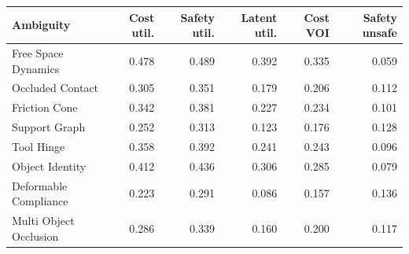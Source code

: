 \begin{tabular}{lrrrrr}
\toprule
Ambiguity & Cost util. & Safety util. & Latent util. & Cost VOI & Safety unsafe \\
\midrule
Free Space Dynamics & 0.478 & 0.489 & 0.392 & 0.335 & 0.059 \\
Occluded Contact & 0.305 & 0.351 & 0.179 & 0.206 & 0.112 \\
Friction Cone & 0.342 & 0.381 & 0.227 & 0.234 & 0.101 \\
Support Graph & 0.252 & 0.313 & 0.123 & 0.176 & 0.128 \\
Tool Hinge & 0.358 & 0.392 & 0.241 & 0.243 & 0.096 \\
Object Identity & 0.412 & 0.436 & 0.306 & 0.285 & 0.079 \\
Deformable Compliance & 0.223 & 0.291 & 0.086 & 0.157 & 0.136 \\
Multi Object Occlusion & 0.286 & 0.339 & 0.160 & 0.200 & 0.117 \\
\bottomrule
\end{tabular}
